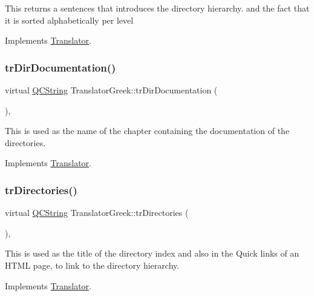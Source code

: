 This returns a sentences that introduces the directory hierarchy. and the fact that it is sorted alphabetically per level 

Implements \mbox{\hyperlink{class_translator}{Translator}}.

\mbox{\label{class_translator_greek_a02ec83db473704443c1f50668b5cfd27}} 
\subsubsection{\texorpdfstring{trDirDocumentation()}{trDirDocumentation()}}
{\footnotesize\ttfamily virtual \mbox{\hyperlink{class_q_c_string}{Q\+C\+String}} Translator\+Greek\+::tr\+Dir\+Documentation (\begin{DoxyParamCaption}{ }\end{DoxyParamCaption})\hspace{0.3cm}{\ttfamily [inline]}, {\ttfamily [virtual]}}

This is used as the name of the chapter containing the documentation of the directories. 

Implements \mbox{\hyperlink{class_translator}{Translator}}.

\mbox{\label{class_translator_greek_a1ee5ab25e11186483ca236f6b2cfcdff}} 
\subsubsection{\texorpdfstring{trDirectories()}{trDirectories()}}
{\footnotesize\ttfamily virtual \mbox{\hyperlink{class_q_c_string}{Q\+C\+String}} Translator\+Greek\+::tr\+Directories (\begin{DoxyParamCaption}{ }\end{DoxyParamCaption})\hspace{0.3cm}{\ttfamily [inline]}, {\ttfamily [virtual]}}

This is used as the title of the directory index and also in the Quick links of an H\+T\+ML page, to link to the directory hierarchy. 

Implements \mbox{\hyperlink{class_translator}{Translator}}.

